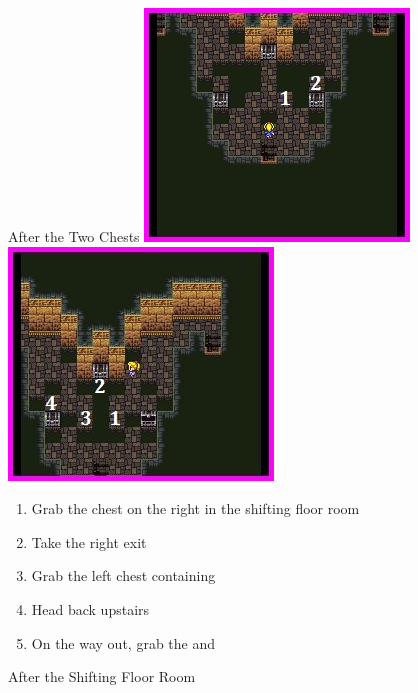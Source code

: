 \begin{paracol}{2}
\switchcolumn*
\begin{steproute}{After the Two Chests}
    \includegraphics[scale=0.449]{../Graphics/Steps/177. Pyramid 2.jpeg}
    \includegraphics[scale=0.449]{../Graphics/Steps/178. Pyramid 3.jpeg}
\end{steproute}

\switchcolumn
\newpage
\begin{enumerate}[resume]
    \item Grab the  chest on the right in the shifting floor room
    \item Take the right exit
    \item Grab the left chest containing 
    \item Head back upstairs
    \item On the way out, grab the  and 
\end{enumerate}

\switchcolumn
\begin{steproute}{After the Shifting Floor Room}
\end{steproute}

\end{paracol}